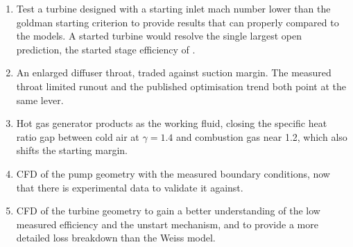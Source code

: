 \begin{enumerate}
    \item Test a turbine designed with a starting inlet mach number lower than the goldman starting criterion to provide results that can properly compared to the models. A started turbine would resolve the single largest open prediction, the started stage efficiency of \valTurbEtaTsDesign.
    \item An enlarged diffuser throat, traded against suction margin. The measured throat limited runout and the published optimisation trend \cite{danieliConceptualDesignElectric2023} both point at the same lever.
    \item Hot gas generator products as the working fluid, closing the specific heat ratio gap between cold air at $\gamma = 1.4$ and combustion gas near 1.2, which also shifts the starting margin.
    \item CFD of the pump geometry with the measured boundary conditions, now that there is experimental data to validate it against.
    \item CFD of the turbine geometry to gain a better understanding of the low measured efficiency and the unstart mechanism, and to provide a more detailed loss breakdown than the Weiss model.
\end{enumerate}